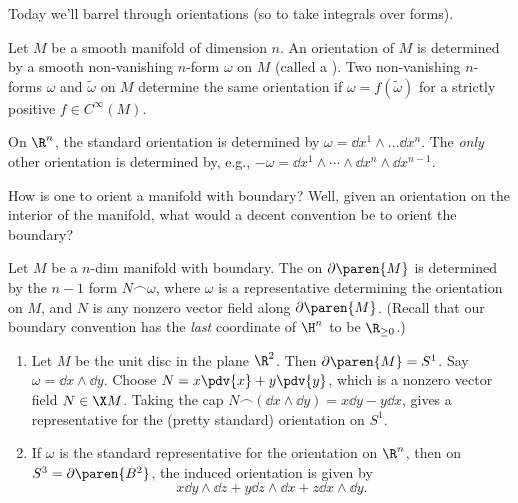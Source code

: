 Today we'll barrel through orientations (so to take integrals over forms).

Let $M$ be a smooth manifold of dimension $n$. An orientation of $M$ is determined by a smooth non-vanishing $n$-form $\omega$ on $M$ (called a ). Two non-vanishing $n$-forms $\omega$ and $\tilde \omega$ on $M$ determine the same orientation if $\omega = f (\tilde \omega)$ for a strictly positive $f \in C^\infty(M)$.

\begin{ex}
\label{standard-orientation-on-euclidean-space}
    On $\R^n$, the standard orientation is determined by $\omega = \dd{x^1} \wedge \ldots \dd{x^n}$. The \emph{only} other orientation is determined by, e.g., $- \omega = \dd{x^1} \wedge \cdots \wedge \dd{x^n} \wedge \dd{x^{n-1}}$.
\end{ex}

How is one to orient a manifold with boundary? Well, given an orientation on the interior of the manifold, what would a decent convention be to orient the boundary?

Let $M$ be a $n$-dim manifold with boundary. The  on $\partial\paren{M}$ is determined by the $n-1$ form $N \frown \omega$, where $\omega$ is a representative determining the orientation on $M$, and $N$ is any  nonzero vector field along $\partial\paren{M}$. (Recall that our boundary convention has the \emph{last} coordinate of $\H^n$ to be $\R_{\ge 0}$.)

\newcommand{\w}{\wedge} 
\newcommand{\wmany}{\wedge \cdots \wedge} 

\begin{ex}
    \label{ex:calc_iii_orientations}
    \hfill
    \begin{enumerate}
        \item Let $M$ be the unit disc in the plane $\R^2$. Then $\partial\paren{M} = S^1$. Say $\omega = \dd{x} \wedge \dd{y}$. Choose $N = x\pdv{x} + y\pdv{y}$, which is a nonzero vector field $N \in \X M$.
              Taking the cap $N \frown (\dd{x} \w   \dd{y}) = x \dd{y} - y \dd{x}$, gives a representative for the (pretty standard) orientation on $S^1$.
        \item If $\omega$ is the standard representative for the orientation on $\R^n$, then on $S^3 = \partial\paren{B^2}$, the induced orientation is given by
            \begin{equation*}
                x \dd{y} \w \dd{z} + y \dd{z} \w \dd{x} + z \dd{x} \w \dd{y}.
            \end{equation*}
    \end{enumerate}
\end{ex}

